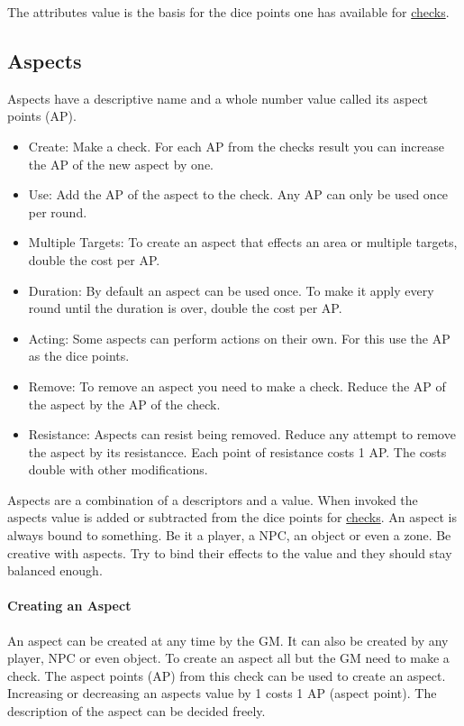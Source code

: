 \documentclass[11pt]{article}
\begin{document}
{The attributes value is the basis for the dice points one has available for \hyperref[sec:orgfdfbc9b]{checks}. 
\subsection{Aspects}
\label{sec:orga25965a}
\begin{short}
Aspects have a descriptive name and a whole number value called its aspect points (AP).
\begin{itemize}
\item Create: Make a check. For each AP from the checks result you can increase the AP of the new aspect by one.
\item Use: Add the AP of the aspect to the check. Any AP can only be used once per round.
\item Multiple Targets: To create an aspect that effects an area or multiple targets, double the cost per AP.
\item Duration: By default an aspect can be used once. To make it apply every round until the duration is over, double the cost per AP.
\item Acting: Some aspects can perform actions on their own. For this use the AP as the dice points.
\item Remove: To remove an aspect you need to make a check. Reduce the AP of the aspect by the AP of the check.
\item Resistance: Aspects can resist being removed. Reduce any attempt to remove the aspect by its resistancce. Each point of resistance costs 1 AP. The costs double with other modifications.
\end{itemize}
\end{short}

Aspects are a combination of a descriptors and a value. When invoked the aspects value is added or subtracted from the dice points  for \hyperref[sec:orgfdfbc9b]{checks}. An aspect is always bound to something. Be it a player, a NPC, an object or even a zone. Be creative with aspects. Try to bind their effects to the value and they should stay balanced enough.
\paragraph*{Creating an Aspect}
\label{sec:org8f77fb7}

An aspect can be created at any time by the GM. It can also be created by any player, NPC or even object. To create an aspect all but the GM need to make a check. The aspect points (AP) from this check can be used to create an aspect. Increasing or decreasing an aspects value by 1 costs 1 AP (aspect point). The description of the aspect can be decided freely. 

}
\end{document}
